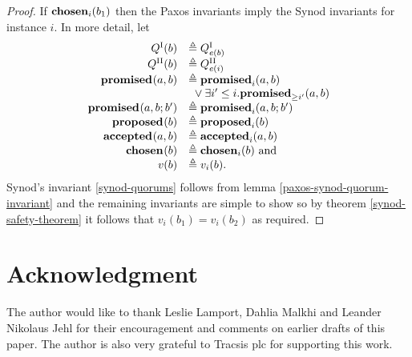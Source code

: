 \documentclass[journal]{IEEEtran}
\begin{document}
\begin{proof} If $\mathbf{chosen}_{i}(b_1)$ then the Paxos invariants imply the Synod
invariants for instance $i$.  In more detail, let
\[\begin{array}{rl}
Q^\textrm{I}(b) &\triangleq {Q}^\textrm{I}_{e(b)} \\
Q^\textrm{II}(b) &\triangleq {Q}^\textrm{II}_{e(i)} \\
\mathbf{promised}_{}(a,b) &\triangleq \mathbf{promised}_{i}(a,b) \\
& \ {}\vee \exists i' \le i. \mathbf{promised}_{\ge i'}(a,b) \\
\mathbf{promised}_{}(a,b;b') &\triangleq \mathbf{promised}_{i}(a,b;b') \\
\mathbf{proposed}_{}(b) &\triangleq \mathbf{proposed}_{i}(b) \\
\mathbf{accepted}_{}(a,b) &\triangleq \mathbf{accepted}_{i}(a,b) \\
\mathbf{chosen}_{}(b) &\triangleq \mathbf{chosen}_{i}(b) \textrm{ and} \\
v(b) &\triangleq v_i(b) .\\
\end{array}
\]
Synod's invariant \ref{synod-quorums} follows from lemma
\ref{paxos-synod-quorum-invariant} and the remaining invariants are simple to
show so by theorem \ref{synod-safety-theorem} it follows that $v_i(b_1) =
v_i(b_2)$ as required.  \end{proof}

\section*{Acknowledgment}

The author would like to thank Leslie Lamport, Dahlia Malkhi and Leander
Nikolaus Jehl for their encouragement and comments on earlier drafts of this
paper. The author is also very grateful to Tracsis plc for supporting this
work.



\ifCLASSOPTIONcaptionsoff
  \newpage
\fi




\end{document}
